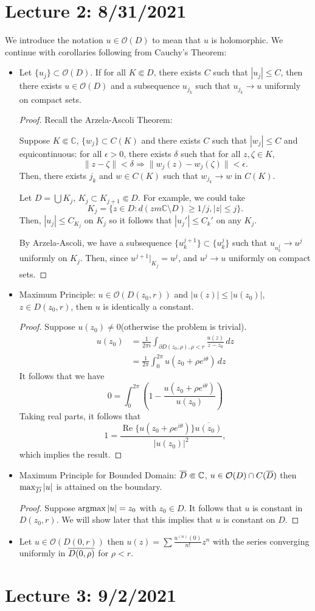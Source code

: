 \documentclass[11pt]{scrartcl}
\newcommand{\C}{\mathbb C}
\renewcommand{\Re}{\operatorname{Re}}
\let \mc \mathcal
\let \bar \overline
\newcommand{\1}{\textbf{1}} %
\begin{document}
\section{Lecture 2: 8/31/2021}
We introduce the notation $u \in \mc O(D)$ to mean that $u$ is holomorphic.
We continue with corollaries following from Cauchy's Theorem:
\begin{itemize}
\item Let $\{u_j\} \subset \mc O(D)$.  If for all $K \Subset D$, there exists $C$ such that $|u_j| \le C$, then there exists $u \in \mc O(D)$ and a subsequence $u_{j_k}$ such that $u_{j_k} \to u$ uniformly on compact sets.  
\begin{proof}
Recall the Arzela-Ascoli Theorem:
\begin{theorem} Suppose $K \Subset \C$, $\{w_j\} \subset C(K)$ and there exists $C$ such that $|w_j| \le C$ and equicontinuous: for all $\epsilon > 0$, there exists $\delta$ such that for all $z, \zeta \in K$,
$$\|z - \zeta\| < \delta \Rightarrow \|w_j(z) - w_j(\zeta) \| < \epsilon.$$
Then, there exists $j_k$ and $w \in C(K)$ such that $w_{j_k} \to w$ in $C(K)$.
\end{theorem}
Let $D = \bigcup K_j$, $K_j \subset K_{j + 1} \Subset D$.  For example, we could take
$$K_j = \{z \in D : d(z m \C \setminus D) \ge 1/j, |z| \le j\}.$$
Then, $|u_j| \le C_{K_j}$ on ${K_j}$ so it follows that $|u_{j}'| \le C_k'$ on any $K_j$.

By Arzela-Ascoli, we have a subsequence $\{u_{k}^{j + 1}\} \subset \{u_k^j\}$ such that $u_{n_k^j} \to u^j$ uniformly on $K_j$.  Then, since $u^{j + 1} \vert_{K_j} = u^j$, and $u^j \to u$ uniformly on compact sets.  
\end{proof}
\item Maximum Principle: $u \in \mc O(D(z_0, r))$ and $|u(z)| \le |u(z_0)|$, $z \in D(z_0, r)$, then $u$ is identically a constant.  
\begin{proof}
Suppose $u(z_0) \ne 0$(otherwise the problem is trivial).  
\begin{align*}
u(z_0) &= \frac{1}{2\pi i} \int_{\partial D(z_0, \rho), \rho < r} \frac{u(z)}{z - z_0} \,dz \\
&= \frac{1}{2\pi} \int_0^{2\pi} u(z_0 + \rho e^{i \theta})\,dz 
\end{align*}
It follows that we have 
$$0 = \int_0^{2\pi} \left (1 - \frac{u(z_0 + \rho e^{i \theta})}{u(z_0)} \right)$$
Taking real parts, it follows that 
$$1 = \frac{\Re\{u(z_0 + \rho e^{i \theta})\} \bar{u(z_0)}}{|u(z_0)|^2},$$
which implies the result.
\end{proof}
\item Maximum Principle for Bounded Domain: $\ol{D} \Subset \C$, $u \in \mc O(D) \cap C(\ol{D})$ then $\max_{\overline{D}} |u|$ is attained on the boundary.
\begin{proof}
Suppose $\operatorname*{arg max} |u| = z_0$ with $z_0 \in D$.  It follows that $u$ is constant in $D(z_0, r)$.  We will show later that this implies that $u$ is constant on $D$.  
\end{proof}
\item Let $u \in \mc O(D(0, r))$ then $u(z) = \sum \frac{u^{(n)}(0)}{n!}z^n$ with the series converging uniformly in $\overline{D(0, \rho)}$ for $\rho < r$. 
\end{itemize}
\pagebreak
\section{Lecture 3: 9/2/2021}
\end{document}

